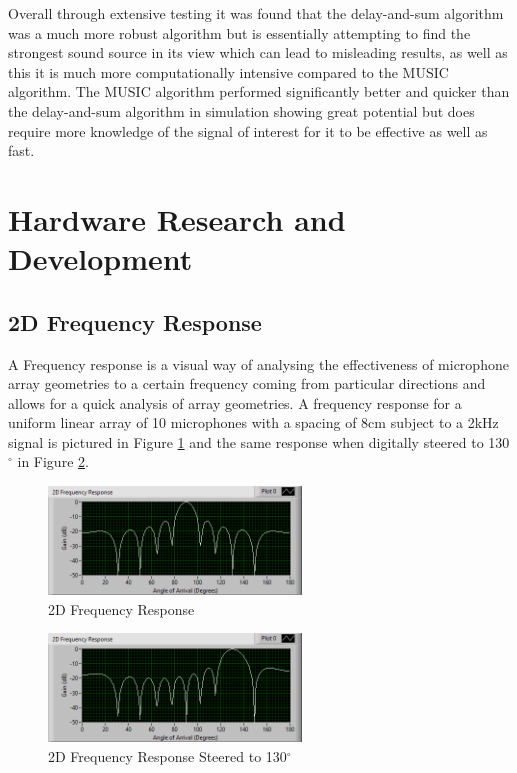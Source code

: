 \documentclass{UoNMCHA}
\numberwithin{equation}{section}
\begin{document}
    Overall through extensive testing it was found that the delay-and-sum algorithm was a much more robust algorithm but is essentially attempting to find the strongest sound source in its view which can lead to misleading results, as well as this it is much more computationally intensive compared to the MUSIC algorithm. The MUSIC algorithm performed significantly better and quicker than the delay-and-sum algorithm in simulation showing great potential but does require more knowledge of the signal of interest for it to be effective as well as fast.
    
\newpage
\section{Hardware Research and Development} \label{sec:Hardware}
\subsection{2D Frequency Response} \label{sec:2D Freq Response}
    A Frequency response is a visual way of analysing the effectiveness of microphone array geometries to a certain frequency coming from particular directions and allows for a quick analysis of array geometries. A frequency response for a uniform linear array of 10 microphones with a spacing of $8$cm subject to a 2kHz signal is pictured in Figure \ref{fig:2DFreqResponseLin} and the same response when digitally steered to 130$^{\circ}$ in Figure \ref{fig:2DResponseSteered}.
    
    \begin{figure}[H]
        \centering
        \includegraphics[keepaspectratio, width = 0.6\textwidth]{Figures/FrequencyResponse2K10Lin.png}
        \caption{2D Frequency Response}
        \label{fig:2DFreqResponseLin}
    \end{figure}
    \begin{figure}[H]
        \centering
        \includegraphics[keepaspectratio, width = 0.6\textwidth]{Figures/2DResponseSteered.png}
        \caption{2D Frequency Response Steered to 130$^{\circ}$}
        \label{fig:2DResponseSteered}
    \end{figure}
    
\end{document}
